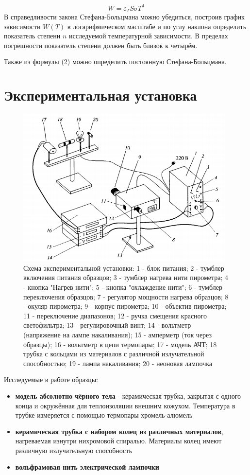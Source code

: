 \documentclass[a4paper,12pt]{article} %
\begin{document}
	\begin{equation}
		W = \varepsilon_T S \sigma T^4
	\end{equation}
	В справедливости закона Стефана-Больцмана можно убедиться, построив график зависимости $W(T)$ в логарифмическом масштабе и по углу наклона определить показатель степени $n$ исследуемой температурной зависимости. В пределах погрешности показатель степени должен быть близок к четырём. \par
	Также из формулы (2) можно определить постоянную Стефана-Больцмана.


	\section{Экспериментальная установка}

	\begin{figure}[h]
		\centering
		\includegraphics[width=11cm]{fig1.PNG}
		\caption{Схема экспериментальной установки: 1 - блок питания; 2 - тумблер включения питания образцов; 3 - тумблер нагрева нити пирометра; 4 - кнопка "Нагрев нити"; 5 - кнопка "охлаждение нити"; 6 - тумблер переключения образцов; 7 - регулятор мощности нагрева образцов; 8 - окуляр пирометра; 9 - корпус пирометра; 10 - объектив пирометра; 11 - переключение диапазонов; 12 - ручка смещения красного светофильтра; 13 - регулировочный винт; 14 - вольтметр (напряжение на лампе накаливания); 15 - амперметр (ток через образцы); 16 - вольтметр в цепи термопары; 17 - модель АЧТ; 18 трубка с кольцами из материалов с различной излучательной способностью; 19 - лампа накаливания; 20 - неоновая лампочка}
	\end{figure}
	Исследуемые в работе образцы:
	\begin{itemize}
		\item \textbf{модель абсолютно чёрного тела} - керамическая трубка, закрытая с одного конца и окружённая для теплоизоляции внешним кожухом. Температура в трубке измеряется с помощью термопары хромель-алюмель
		\item \textbf{керамическая трубка с набором колец из различных материалов}, нагреваемая изнутри нихромовой спиралью. Материалы колец имеют различную излучательную способность
		\item \textbf{вольфрамовая нить электрической лампочки}
	\end{itemize}
	\newpage
\end{document}
